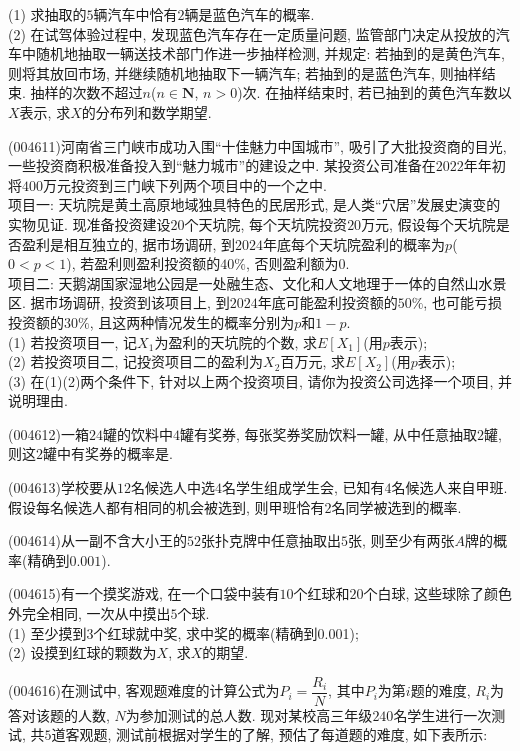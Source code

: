(1) 求抽取的$5$辆汽车中恰有$2$辆是蓝色汽车的概率.\\
(2) 在试驾体验过程中, 发现蓝色汽车存在一定质量问题, 监管部门决定从投放的汽车中随机地抽取一辆送技术部门作进一步抽样检测, 并规定: 若抽到的是黄色汽车, 则将其放回市场, 并继续随机地抽取下一辆汽车; 若抽到的是蓝色汽车, 则抽样结束. 抽样的次数不超过$n$($n\in \mathbf{N}$, $n>0$)次. 在抽样结束时, 若已抽到的黄色汽车数以$X$表示, 求$X$的分布列和数学期望.
\item (004611)河南省三门峡市成功入围``十佳魅力中国城市'', 吸引了大批投资商的目光, 一些投资商积极准备投入到``魅力城市''的建设之中. 某投资公司准备在$2022$年年初将$400$万元投资到三门峡下列两个项目中的一个之中.\\
项目一: 天坑院是黄土高原地域独具特色的民居形式, 是人类``穴居''发展史演变的实物见证. 现准备投资建设$20$个天坑院, 每个天坑院投资$20$万元, 假设每个天坑院是否盈利是相互独立的, 据市场调研, 到$2024$年底每个天坑院盈利的概率为$p$($0<p<1$), 若盈利则盈利投资额的$40\%$, 否则盈利额为$0$.\\
项目二: 天鹅湖国家湿地公园是一处融生态、文化和人文地理于一体的自然山水景区. 据市场调研, 投资到该项目上, 到$2024$年底可能盈利投资额的$50\%$, 也可能亏损投资额的$30\%$, 且这两种情况发生的概率分别为$p$和$1-p$.\\
(1) 若投资项目一, 记$X_1$为盈利的天坑院的个数, 求$E[X_1]$(用$p$表示);\\
(2) 若投资项目二, 记投资项目二的盈利为$X_2$百万元, 求$E[X_2]$(用$p$表示);\\
(3) 在(1)(2)两个条件下, 针对以上两个投资项目, 请你为投资公司选择一个项目, 并说明理由.
\item (004612)一箱$24$罐的饮料中$4$罐有奖券, 每张奖券奖励饮料一罐, 从中任意抽取$2$罐, 则这$2$罐中有奖券的概率是.
\item (004613)学校要从$12$名候选人中选$4$名学生组成学生会, 已知有$4$名候选人来自甲班. 假设每名候选人都有相同的机会被选到, 则甲班恰有$2$名同学被选到的概率.
\item (004614)从一副不含大小王的$52$张扑克牌中任意抽取出$5$张, 则至少有两张$A$牌的概率(精确到$0.001$).
\item (004615)有一个摸奖游戏, 在一个口袋中装有$10$个红球和$20$个白球, 这些球除了颜色外完全相同, 一次从中摸出$5$个球.\\
(1) 至少摸到$3$个红球就中奖, 求中奖的概率(精确到0.001);\\
(2) 设摸到红球的颗数为$X$, 求$X$的期望.
\item (004616)在测试中, 客观题难度的计算公式为$P_i=\dfrac{R_i}N$, 其中$P_i$为第$i$题的难度, $R_i$为答对该题的人数, $N$为参加测试的总人数. 现对某校高三年级$240$名学生进行一次测试, 共$5$道客观题, 测试前根据对学生的了解, 预估了每道题的难度, 如下表所示:
